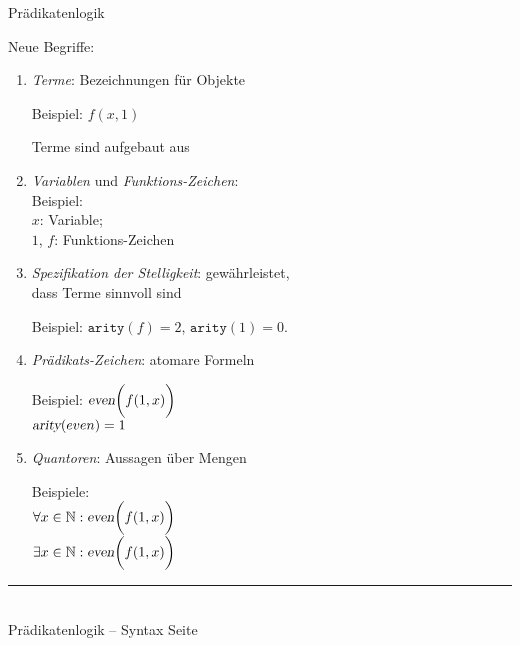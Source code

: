 \documentclass{slides}
\newcommand{\myrule}{\rule{20cm}{1mm}\\ }
\newcounter{mypage}
\begin{document}
\begin{center}
Prädikatenlogik
\end{center}
\vspace*{0.5cm}

\footnotesize
Neue Begriffe:
\begin{enumerate}
\item \emph{Terme}: Bezeichnungen für Objekte

       Beispiel: $f(x, 1)$

       Terme sind aufgebaut aus
\item \emph{Variablen} und \emph{Funktions-Zeichen}: \\

      Beispiel:\\[0.1cm]
      \hspace*{1.3cm} 
      $x$: Variable; \\
      \hspace*{1.3cm} 
      $1$, $f$: Funktions-Zeichen
\item \emph{Spezifikation der Stelligkeit}: gewährleistet, \\
      dass Terme sinnvoll sind

      Beispiel: $\mathtt{arity}(f) = 2$, \quad $\mathtt{arity}(1) = 0$.
\item \emph{Prädikats-Zeichen}: atomare Formeln

      Beispiel: $\textsl{even}\bigg(f(1,x)\bigg)$ \\[0.1cm]
      \hspace*{1.3cm} $\textsl{arity}(even) = 1$
\item \emph{Quantoren}: Aussagen über Mengen 

      Beispiele: \\[0.1cm]
\hspace*{1.3cm} $\forall x \in \mathbb{N}:\textsl{even}\bigg(f(1,x)\bigg)$\\[0.1cm]
\hspace*{1.3cm} $\exists x \in \mathbb{N}:\textsl{even}\bigg(f(1,x)\bigg)$\\[0.1cm]
\end{enumerate}


\vspace*{\fill}
\tiny \addtocounter{mypage}{1} 
\myrule
Prädikatenlogik -- Syntax \hspace*{\fill} Seite 


\end{document}
